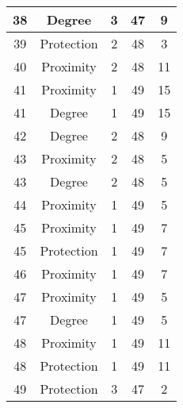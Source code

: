 \documentclass[results.tex]{subfiles}
\begin{document}
\begin{center}
\begin{tabular}{| c || c | c | c | c |}
    \hline
    38 & Degree & 3 & 47 & 9 \\ 
    \hline
    39 & Protection & 2 & 48 & 3 \\ 
    \hline
    40 & Proximity & 2 & 48 & 11 \\ 
    \hline
    41 & Proximity & 1 & 49 & 15 \\ 
    \hline
    41 & Degree & 1 & 49 & 15 \\ 
    \hline
    42 & Degree & 2 & 48 & 9 \\ 
    \hline
    43 & Proximity & 2 & 48 & 5 \\ 
    \hline
    43 & Degree & 2 & 48 & 5 \\ 
    \hline
    44 & Proximity & 1 & 49 & 5 \\ 
    \hline
    45 & Proximity & 1 & 49 & 7 \\ 
    \hline
    45 & Protection & 1 & 49 & 7 \\ 
    \hline
    46 & Proximity & 1 & 49 & 7 \\ 
    \hline
    47 & Proximity & 1 & 49 & 5 \\ 
    \hline
    47 & Degree & 1 & 49 & 5 \\ 
    \hline
    48 & Proximity & 1 & 49 & 11 \\ 
    \hline
    48 & Protection & 1 & 49 & 11 \\ 
    \hline
    49 & Protection & 3 & 47 & 2 \\ 
    \hline   \end{tabular}
\end{center}
\end{document}
